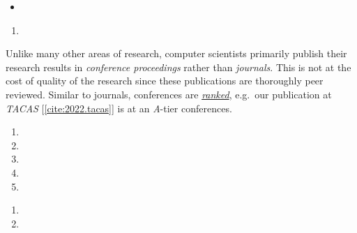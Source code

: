 \newpage
{}


  


  \begin{itemize}
  \item 
  \end{itemize}

\begin{fullwidth}

  \begin{enumerate} \normalsize
  \item 
  \end{enumerate}


  Unlike many other areas of research, computer scientists primarily publish their research results
  in \emph{conference proceedings} rather than \emph{journals}. This is not at the cost of quality
  of the research since these publications are thoroughly peer reviewed. Similar to journals,
  conferences are \href{https://portal.core.edu.au/conf-ranks/}{\emph{ranked}}, e.g.\ our
  publication at \emph{TACAS} [\ref{cite:2022.tacas}] is at an \emph{A}-tier conferences.

  \medskip

  \divider

  \begin{enumerate} \normalsize \setcounter{enumi}{1}
  \item  \divider
  \item  \divider
  \item  \divider
  \item  \divider
  \item 
  \end{enumerate}

  \begin{enumerate} \normalsize \setcounter{enumi}{6}
  \item  \divider
  \item 
  \end{enumerate}
\end{fullwidth}



